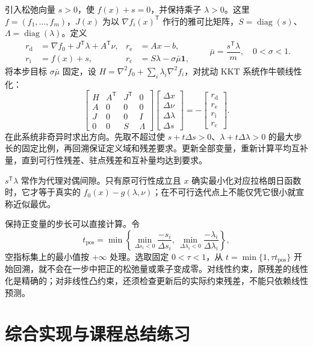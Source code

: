 \documentclass[UTF8,12pt,a4paper,fontset=fandol]{ctexbook}
\begin{document}
引入松弛向量 $s>0$，使 $f(x)+s=0$，并保持乘子 $\lambda>0$。这里 $f=(f_1,\ldots,f_m)$，$J(x)$ 为以 $\nabla f_i(x)^{\mathsf T}$ 作行的雅可比矩阵，$S=\operatorname{diag}(s)$、$\Lambda=\operatorname{diag}(\lambda)$。定义
\[
 \begin{aligned}
 r_{\mathrm d}&=\nabla f_0+J^{\mathsf T}\lambda+A^{\mathsf T}\nu,&
 r_{\mathrm e}&=Ax-b,\\
 r_{\mathrm i}&=f(x)+s,&
 r_{\mathrm c}&=S\lambda-\sigma\bar\mu\mathbf1,
 \end{aligned}
 \qquad \bar\mu=\frac{s^{\mathsf T}\lambda}{m},\quad0<\sigma<1.
\]
将本步目标 $\sigma\bar\mu$ 固定，设 $H=\nabla^2f_0+\sum_i\lambda_i\nabla^2f_i$，对扰动 KKT 系统作牛顿线性化：
\[
 \begin{bmatrix}
 H&A^{\mathsf T}&J^{\mathsf T}&0\\
 A&0&0&0\\
 J&0&0&I\\
 0&0&S&\Lambda
 \end{bmatrix}
 \begin{bmatrix}\Delta x\\\Delta\nu\\\Delta\lambda\\\Delta s\end{bmatrix}
 =-\begin{bmatrix}r_{\mathrm d}\\r_{\mathrm e}\\r_{\mathrm i}\\r_{\mathrm c}\end{bmatrix}.
\]
在此系统非奇异时求出方向。先取不超过使 $s+t\Delta s>0$、$\lambda+t\Delta\lambda>0$ 的最大步长的固定比例，再回溯保证定义域和残差要求。更新全部变量，重新计算平均互补量，直到可行性残差、驻点残差和互补量均达到要求。

$s^{\mathsf T}\lambda$ 常作为代理对偶间隙。只有原可行性成立且 $x$ 确实最小化对应拉格朗日函数时，它才等于真实的 $f_0(x)-g(\lambda,\nu)$；在不可行迭代点上不能仅凭它很小就宣称近似最优。

保持正变量的步长可以直接计算。令
\[
 t_{\mathrm{pos}}=\min\left\{
 \min_{\Delta s_i<0}\frac{-s_i}{\Delta s_i},
 \ \min_{\Delta\lambda_i<0}\frac{-\lambda_i}{\Delta\lambda_i}
 \right\},
\]
空指标集上的最小值按 $+\infty$ 处理。选取固定 $0<\tau<1$，从 $t=\min\{1,\tau t_{\mathrm{pos}}\}$ 开始回溯，就不会在一步中把正的松弛量或乘子变成零。对线性约束，原残差的线性化是精确的；对非线性凸约束，还须检查更新后的实际约束残差，不能只依赖线性预测。

\section{综合实现与课程总结练习}
\end{document}
